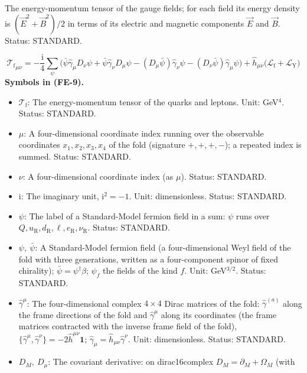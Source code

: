 \documentclass[
  10pt,
]{article}
\providecommand{\tightlist}{%
  \setlength{\itemsep}{0pt}\setlength{\parskip}{0pt}}
\begin{document}
The energy-momentum tensor of the gauge fields; for each field its
energy density is \((\vec E^2 + \vec B^2)/2\) in terms of its electric
and magnetic components \(\vec E\) and \(\vec B\). Status: STANDARD.

\[
{\mathcal{T}_{\mathrm{f}}}_{\mu\nu} = -\frac{\mathrm{i}}{4}\sum_\psi\Big(\bar\psi\hat\gamma_\mu D_\nu\psi + \bar\psi\hat\gamma_\nu D_\mu\psi
 - (D_\mu\bar\psi)\hat\gamma_\nu\psi - (D_\nu\bar\psi)\hat\gamma_\mu\psi\Big) + \hat h_{\mu\nu}\big(\mathcal{L}_{\mathrm{f}} + \mathcal{L}_{\mathrm{Y}}\big) \tag{FE-9}
\] \textbf{Symbols in (FE-9).}

\begin{itemize}
\tightlist
\item
  \(\mathcal{T}_{\mathrm{f}}\): The energy-momentum tensor of the quarks
  and leptons. Unit: GeV\(^4\). Status: STANDARD.
\item
  \(\mu\): A four-dimensional coordinate index running over the
  observable coordinates \(x_1, x_2, x_3, x_4\) of the fold (signature
  \(+,+,+,-\)); a repeated index is summed. Status: STANDARD.
\item
  \(\nu\): A four-dimensional coordinate index (as \(\mu\)). Status:
  STANDARD.
\item
  \(\mathrm{i}\): The imaginary unit, \(\mathrm{i}^2 = -1\). Unit:
  dimensionless. Status: STANDARD.
\item
  \(\psi\): The label of a Standard-Model fermion field in a sum:
  \(\psi\) runs over
  \(Q, u_{\mathrm{R}}, d_{\mathrm{R}}, \ell, e_{\mathrm{R}}, \nu_{\mathrm{R}}\).
  Status: STANDARD.
\item
  \(\psi,\ \bar\psi\): A Standard-Model fermion field (a
  four-dimensional Weyl field of the fold with three generations,
  written as a four-component spinor of fixed chirality);
  \(\bar\psi = \psi^\dagger\beta\); \(\psi_f\) the fields of the kind
  \(f\). Unit: GeV\(^{3/2}\). Status: STANDARD.
\item
  \(\hat\gamma^\mu\): The four-dimensional complex \(4 \times 4\) Dirac
  matrices of the fold: \(\hat\gamma^{(a)}\) along the frame directions
  of the fold and \(\hat\gamma^\mu\) along its coordinates (the frame
  matrices contracted with the inverse frame field of the fold),
  \(\{\hat\gamma^\mu, \hat\gamma^\nu\} = -2\hat h^{\mu\nu}\mathbf{1}\);
  \(\hat\gamma_\mu = \hat h_{\mu\nu}\hat\gamma^\nu\). Unit:
  dimensionless. Status: STANDARD.
\item
  \(D_M,\ D_\mu\): The covariant derivative: on dirac16complex
  \(D_M = \partial_M + \Omega_M\) (with

\end{itemize}
\end{document}
